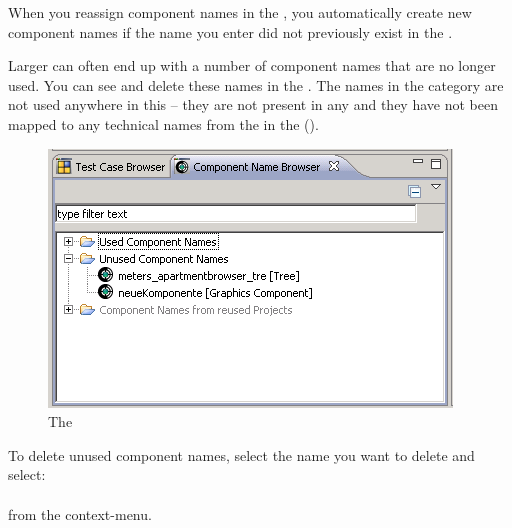 
When you reassign component names in the \gdcompnamesview{}, you automatically create new component names if the name you enter did not previously exist in the \gdproject{}. 

Larger \gdprojects{} can often end up with a number of component names that are no longer used. You can see and delete these names in the \gdcompnamebrowser{}. 
The names in the  category are not used anywhere in this \gdproject{} -- they are not present in any \gdcases{} and they have not been mapped to any technical names from the \gdaut{} in the \gdomeditor{} (\bxfigref{}). 

\begin{figure}[h]
\begin{center}
\includegraphics{Tasks/Compnames/PS/compnamebrowser}
\caption{The \gdcompnamebrowser{}}
\label{compnamebrowser}
\end{center}
\end{figure} 

To delete unused component names, select the name you want to delete and select:\\
\\
from the context-menu. 

